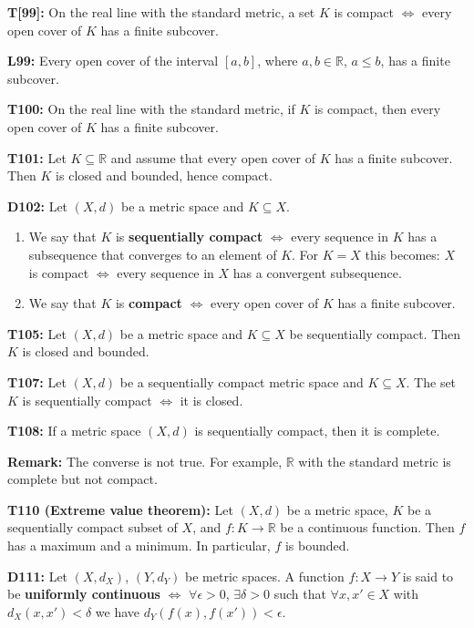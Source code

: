 \documentclass[twocolumn,10pt]{article}
\begin{document}
\textbf{T[99]:} On the real line with the standard metric, a set $K$ is compact $\Leftrightarrow$ every open cover of $K$ has a finite subcover.

\textbf{L99:} Every open cover of the interval $[a,b]$, where $a,b\in\mathbb{R}$, $a\leq b$, has a finite subcover.

\textbf{T100:} On the real line with the standard metric, if $K$ is compact, then every open cover of $K$ has a finite subcover.

\textbf{T101:} Let $K\subseteq\mathbb{R}$ and assume that every open cover of $K$ has a finite subcover. Then $K$ is closed and bounded, hence compact.

\textbf{D102:} Let $(X,d)$ be a metric space and $K\subseteq X$.
\begin{enumerate}
    \item We say that $K$ is \textbf{sequentially compact} $\Leftrightarrow$ every sequence in $K$ has a subsequence that converges to an element of $K$. For $K=X$ this becomes: $X$ is compact $\Leftrightarrow$ every sequence in $X$ has a convergent subsequence.
    \item We say that $K$ is \textbf{compact} $\Leftrightarrow$ every open cover of $K$ has a finite subcover.
\end{enumerate}

\textbf{T105:} Let $(X,d)$ be a metric space and $K\subseteq X$ be sequentially compact. Then $K$ is closed and bounded.

\textbf{T107:} Let $(X,d)$ be a sequentially compact metric space and $K\subseteq X$. The set $K$ is sequentially compact $\Leftrightarrow$ it is closed.


\textbf{T108:} If a metric space $(X,d)$ is sequentially compact, then it is complete.


\textbf{Remark:} The converse is not true. For example, $\mathbb{R}$ with the standard metric is complete but not compact.

\textbf{T110 (Extreme value theorem):} Let $(X,d)$ be a metric space, $K$ be a sequentially compact subset of $X$, and $f:K\to\mathbb{R}$ be a continuous function. Then $f$ has a maximum and a minimum. In particular, $f$ is bounded.

\textbf{D111:} Let $(X,d_X)$, $(Y,d_Y)$ be metric spaces. A function $f:X\to Y$ is said to be \textbf{uniformly continuous} $\Leftrightarrow$ $\forall\epsilon>0$, $\exists\delta>0$ such that $\forall x,x'\in X$ with $d_X(x,x')<\delta$ we have $d_Y(f(x),f(x'))<\epsilon$.
\end{document}
